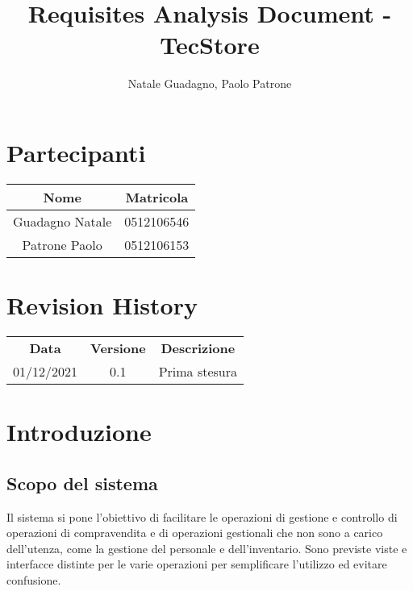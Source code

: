 \documentclass[12pt,a4paper]{article}
\author{Natale Guadagno, Paolo Patrone}
\title{Requisites Analysis Document - TecStore}
\begin{document}
\maketitle
\newpage
\tableofcontents
\newpage
{}
\section*{Partecipanti}
\begin{center}
\begin{tabular} {|c|c|}
\hline
\textbf{Nome} & \textbf{Matricola} \\
\hline
Guadagno Natale & 0512106546 \\
Patrone Paolo & 0512106153 \\
\hline
\end{tabular}
\end{center}


\section*{Revision History}
\begin{center}
\begin{tabular} {|c|c|c|}
\hline
\textbf{Data} & \textbf{Versione} & \textbf{Descrizione} \\
01/12/2021 & 0.1 & Prima stesura \\
\hline

\hline
\end{tabular}
\end{center}

\newpage

\section{Introduzione}

\subsection{Scopo del sistema}
Il sistema si pone l'obiettivo di facilitare le operazioni di gestione e controllo di operazioni di compravendita e di operazioni gestionali che non sono a carico dell'utenza, come la gestione del personale e dell'inventario. Sono previste viste e interfacce distinte per le varie operazioni per semplificare l'utilizzo ed evitare confusione.
\end{document}
